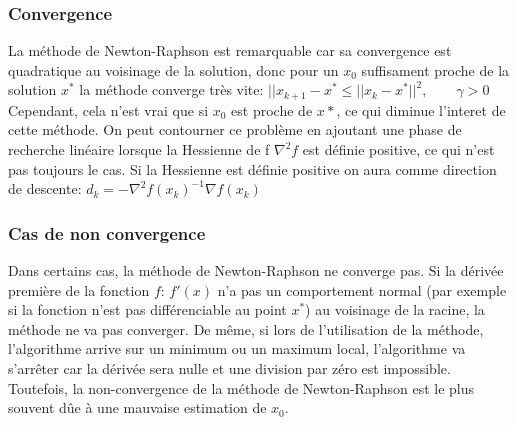 \documentclass[3p, twocolumn]{elsarticle}
\begin{document}
\subsubsection{Convergence}
La méthode de Newton-Raphson est remarquable car sa convergence est quadratique au voisinage de la solution, donc pour un $x_{0}$ suffisament proche de la solution $x^{*}$ la méthode converge très vite: 
\newline
$||x_{k+1}-x^{*} \leq ||x_{k}- x^{*}||^{2}, \qquad \gamma >0$ 
\newline
Cependant, cela n'est vrai que si $x_{0}$ est proche de $x{*}$, ce qui diminue l'interet de cette méthode.
On peut contourner ce problème en ajoutant une phase de recherche linéaire lorsque la Hessienne de f $\nabla ^{2}f$ est définie positive, ce qui n'est pas toujours le cas. Si la Hessienne est définie positive on aura comme direction de descente:
\newline
$d_{k} = -\nabla ^{2}f(x_{k})^{-1} \nabla f(x_{k}) $
\subsubsection{Cas de non convergence}
Dans certains cas, la méthode de Newton-Raphson ne converge pas.
\newline
Si la dérivée première de la fonction $f$: $f'(x)$ n'a pas un comportement normal (par exemple si la fonction n'est pas différenciable au point $x^{*}$) au voisinage de la racine, la méthode ne va pas converger. 
De même, si lors de l'utilisation de la méthode, l'algorithme arrive sur un minimum ou un maximum local, l'algorithme va s'arrêter car la dérivée sera nulle et une division par zéro est impossible.
Toutefois, la non-convergence de la méthode de Newton-Raphson est le plus souvent dûe à une mauvaise estimation de $x_{0}$.
\end{document}

